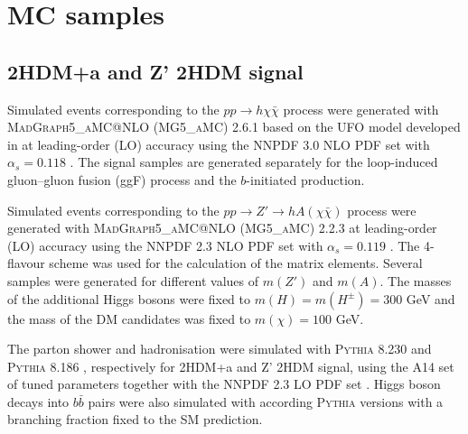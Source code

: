 \section{MC samples}
\label{ch:data-mc-samples}
\subsection{2HDM+a and Z' 2HDM signal}
\label{subsec:signal}
\par Simulated events corresponding to the $pp\to h\chi\bar{\chi}$ process were generated with \textsc{MadGraph5\_aMC@NLO} (\textsc{MG5\_aMC}) 2.6.1 \cite{Alwall:2014hca} 
based on the UFO model developed in \cite{Abe:2018bpo} at leading-order (LO) accuracy using the NNPDF 3.0 NLO PDF set with $\alpha_s=0.118$ \cite{Ball:2014uwa}. 
The signal samples are generated separately for the loop-induced gluon--gluon fusion (ggF) process and the $b$-initiated production. 
\par Simulated events corresponding to the $pp\to Z'\to h A(\chi\bar{\chi})$ process were generated with \textsc{MadGraph5\_aMC@NLO} (\textsc{MG5\_aMC}) 2.2.3 \cite{Alwall:2014hca} at leading-order (LO) accuracy using the NNPDF 2.3 NLO PDF set with $\alpha_s=0.119$ \cite{Ball:2012cx}. 
The 4-flavour scheme was used for the calculation of the matrix elements. Several samples were generated for different values of $m(Z')$ and $m(A)$.
The masses of the additional Higgs bosons were fixed to $m(H)=m(H^{\pm})=300$ GeV and the mass of the DM candidates was fixed to $m(\chi)=100$ GeV. 

\par The parton shower and hadronisation were simulated with \textsc{Pythia} 8.230 \cite{Sjostrand:2014zea} and \textsc{Pythia} 8.186 \cite{Sjostrand:2007gs}, respectively for 2HDM+a and Z' 2HDM signal, using the A14 set \cite{ATL-PHYS-PUB-2014-021} of tuned parameters together with the NNPDF 2.3 LO PDF set \cite{Ball:2011mu}. 
Higgs boson decays into $b\bar{b}$ pairs were also simulated with according \textsc{Pythia} versions with a branching fraction fixed to the SM prediction.

